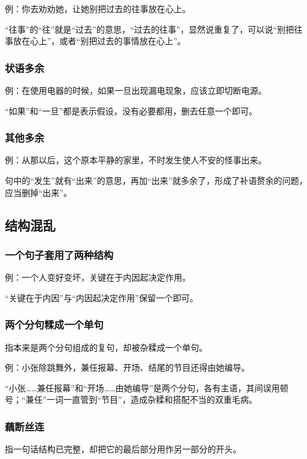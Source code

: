例：你去劝劝她，让她别把过去的往事放在心上。

“往事”的“往”就是“过去”的意思，“过去的往事”，显然说重复了，可以说“别把往事放在心上”，或者“别把过去的事情放在心上”。

\subsubsection{状语多余}

例：在使用电器的时候，如果一旦出现漏电现象，应该立即切断电源。

“如果”和“一旦”都是表示假设，没有必要都用，删去任意一个即可。

\subsubsection{其他多余}

例：从那以后，这个原本平静的家里，不时发生使人不安的怪事出来。

句中的“发生”就有“出来”的意思，再加“出来”就多余了，形成了补语赘余的问题，应当删掉“出来”。

\subsection{结构混乱}

\subsubsection{一个句子套用了两种结构}

例：一个人变好变坏，关键在于内因起决定作用。

“关键在于内因”与“内因起决定作用”保留一个即可。

\subsubsection{两个分句糅成一个单句}

指本来是两个分句组成的复句，却被杂糅成一个单句。

例：小张除跳舞外，兼任报幕、开场、结尾的节目还得由她编导。

“小张……兼任报幕”和“开场……由她编导”是两个分句，各有主语，其间误用顿号；“兼任”一词一直管到“节目”，造成杂糅和搭配不当的双重毛病。

\subsubsection{藕断丝连}

指一句话结构已完整，却把它的最后部分用作另一部分的开头。

